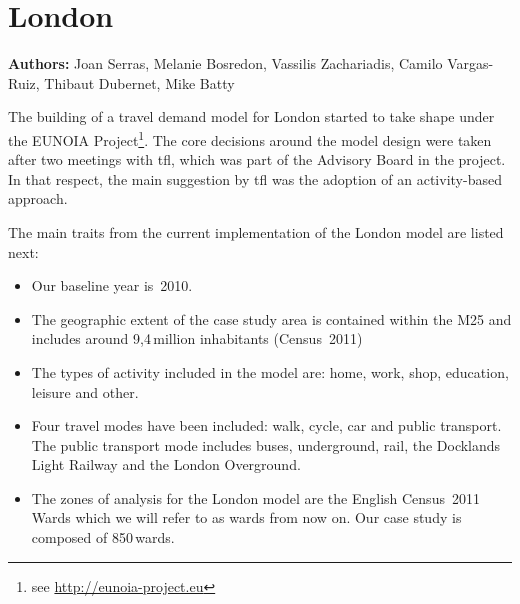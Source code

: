\chapter{London}
\label{ch:london}
\hfill \textbf{Authors:} Joan Serras, Melanie Bosredon, Vassilis Zachariadis, Camilo Vargas-Ruiz, Thibaut Dubernet, Mike Batty

The building of a travel demand model for London started to take shape under the EUNOIA Project\footnote{see \url{http://eunoia-project.eu}}. 
The core decisions around the model design were taken after two meetings with \gls{tfl}, which was part of the Advisory Board in the project. 
In that respect, the main suggestion by \gls{tfl} was the adoption of an activity-based approach.

The main traits from the current implementation of the London model are listed next:
%
\begin{itemize}\styleItemize
\item Our baseline year is~2010.
\item	The geographic extent of the case study area is contained within the M25 and includes around 9,4\,million inhabitants (Census~2011)
\item	The types of activity included in the model are: home, work, shop, education, leisure and other.
\item	Four travel modes have been included: walk, cycle, car and public transport. The public transport mode includes buses, underground, rail, the Docklands Light Railway and the London Overground.
\item	The zones of analysis for the London model are the English Census~2011 Wards which we will refer to as wards from now on. Our case study is composed of 850\,wards.
\end{itemize}
%
